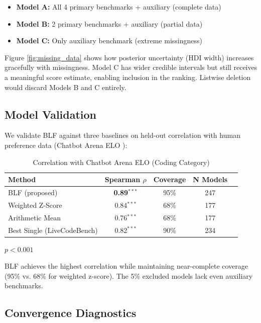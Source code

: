 \begin{itemize}
    \item \textbf{Model A:} All 4 primary benchmarks + auxiliary (complete data)
    \item \textbf{Model B:} 2 primary benchmarks + auxiliary (partial data)
    \item \textbf{Model C:} Only auxiliary benchmark (extreme missingness)
\end{itemize}

Figure \ref{fig:missing_data} shows how posterior uncertainty (HDI width) increases gracefully with missingness. Model C has wider credible intervals but still receives a meaningful score estimate, enabling inclusion in the ranking. Listwise deletion would discard Models B and C entirely.

\subsection{Model Validation}

We validate BLF against three baselines on held-out correlation with human preference data (Chatbot Arena ELO \cite{zheng2023lmsys}):

\begin{table}[h]
\centering
\caption{Correlation with Chatbot Arena ELO (Coding Category)}
\label{tab:validation}
\begin{tabular}{lcccc}
\toprule
\textbf{Method} & \textbf{Spearman $\rho$} & \textbf{Coverage} & \textbf{N Models} \\
\midrule
BLF (proposed)            & \textbf{0.89}$^{***}$ & 95\% & 247 \\
Weighted Z-Score          & 0.84$^{***}$ & 68\% & 177 \\
Arithmetic Mean           & 0.76$^{***}$ & 68\% & 177 \\
Best Single (LiveCodeBench) & 0.82$^{***}$ & 90\% & 234 \\
\bottomrule
\end{tabular}
\begin{tablenotes}
\item[***] $p < 0.001$
\end{tablenotes}
\end{table}

BLF achieves the highest correlation while maintaining near-complete coverage (95\% vs. 68\% for weighted z-score). The 5\% excluded models lack even auxiliary benchmarks.

\subsection{Convergence Diagnostics}


